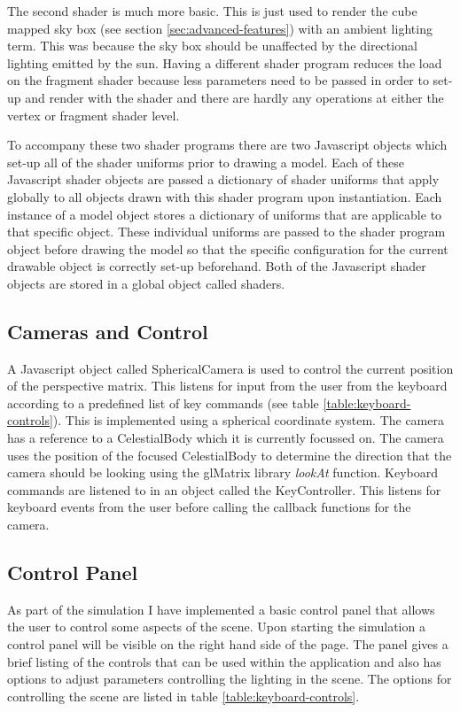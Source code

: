 \documentclass[conference]{IEEEtran}
\begin{document}
The second shader is much more basic. This is just used to render the cube mapped sky box (see section \ref{sec:advanced-features}) with an ambient lighting term. This was because the sky box should be unaffected by the directional lighting emitted by the sun. Having a different shader program reduces the load on the fragment shader because less parameters need to be passed in order to set-up and render with the shader and there are hardly any operations at either the vertex or fragment shader level.

To accompany these two shader programs there are two Javascript objects which set-up all of the shader uniforms prior to drawing a model. Each of these Javascript shader objects are passed a dictionary of shader uniforms that apply globally to all objects drawn with this shader program upon instantiation. Each instance of a model object stores a dictionary of uniforms that are applicable to that specific object. These individual uniforms are passed to the shader program object before drawing the model so that the specific configuration for the current drawable object is correctly set-up beforehand. Both of the Javascript shader objects are stored in a global object called shaders.

\subsection{Cameras and Control}
A Javascript object called SphericalCamera is used to control the current position of the perspective matrix. This listens for input from the user from the keyboard according to a predefined list of key commands (see table \ref{table:keyboard-controls}). This is implemented using a spherical coordinate system. The camera has a reference to a CelestialBody which it is currently focussed on. The camera uses the position of the focused CelestialBody to determine the direction that the camera should be looking using the glMatrix library \cite{glmatrix} \textit{lookAt} function. Keyboard commands are listened to in an object called the KeyController. This listens for keyboard events from the user before calling the callback functions for the camera.

\subsection{Control Panel}
As part of the simulation I have implemented a basic control panel that allows the user to control some aspects of the scene. Upon starting the simulation a control panel will be visible on the right hand side of the page. The panel gives a brief listing of the controls that can be used within the application and also has options to adjust parameters controlling the lighting in the scene. The options for controlling the scene are listed in table \ref{table:keyboard-controls}.
\end{document}
